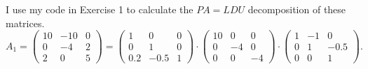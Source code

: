 \documentclass[
  course = {{16-811 Math Fundamentals for Robotics}},
  quartile = {{1}},
  assignment = 1,
  name = {{Kangle Deng}},
  email = {{kangled@andrew.cmu.edu}},
  firstexercise = 1
]{aga-homework}
\begin{document}
\exercise
\subexercise
I use my code in Exercise 1 to calculate the $PA=LDU$ decomposition of these matrices.
\begin{equation*}
    A_1 = 
    \left(
    \begin{array}{ccc}
        10 & -10 & 0 \\
        0 & -4 & 2 \\
        2 & 0 & 5
    \end{array}
    \right) =
    \left(
    \begin{array}{ccc}
        1 & 0 & 0 \\
        0 & 1 & 0 \\
        0.2 & -0.5 & 1
    \end{array}
    \right) \cdot
    \left(
    \begin{array}{ccc}
        10 & 0 & 0 \\
        0 & -4 & 0 \\
        0 & 0 & -4
    \end{array}
    \right) \cdot
    \left(
    \begin{array}{ccc}
        1 & -1 & 0 \\
        0 & 1 & -0.5 \\
        0 & 0 & 1
    \end{array}
    \right).
\end{equation*}
\end{document}
